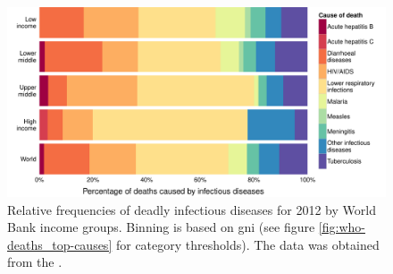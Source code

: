 \begin{knitrout}
\color{fgcolor}\begin{figure}
\includegraphics[width=\maxwidth]{figures/R/who-deaths/byDisease-who-deaths_by-disease-1} \caption[Relative frequencies deadly infectious diseases for 2012 by World Bank income groups]{Relative frequencies of deadly infectious diseases for 2012 by World Bank income groups. Binning is based on \acrfull{gni} (see figure \ref{fig:who-deaths_top-causes} for category thresholds). The data was obtained from the \citet{WHO2012}.}\label{fig:who-deaths_by-disease}
\end{figure}


\end{knitrout}

\newcommand{\knitrPercentageInfectTwelveWorldLRI}{34.5\%}
\newcommand{\knitrPercentageInfectTwelveHighLRI}{57.7\%}
\newcommand{\knitrPercentageInfectTwelveUmidLRI}{43.5\%}
\newcommand{\knitrPercentageInfectTwelveLmidLRI}{30.8\%}
\newcommand{\knitrPercentageInfectTwelveLowLRI}{28.7\%}
\newcommand{\knitrPercentageInfectTwelveHighDiarr}{5.6\%}
\newcommand{\knitrPercentageInfectTwelveUmidDiarr}{7\%}
\newcommand{\knitrPercentageInfectTwelveLmidDiarr}{21.4\%}
\newcommand{\knitrPercentageInfectTwelveLowDiarr}{16.6\%}
\newcommand{\knitrPercentageInfectTwelveWorldAIDS}{17.3\%}
\newcommand{\knitrPercentageInfectTwelveWorldDiarr}{16.9\%}
\newcommand{\knitrPercentageInfectTwelveHighAIDS}{11.3\%}
\newcommand{\knitrPercentageInfectTwelveUmidAIDS}{26.2\%}
\newcommand{\knitrPercentageInfectTwelveLmidAIDS}{13.3\%}
\newcommand{\knitrPercentageInfectTwelveLowAIDS}{20.4\%}
